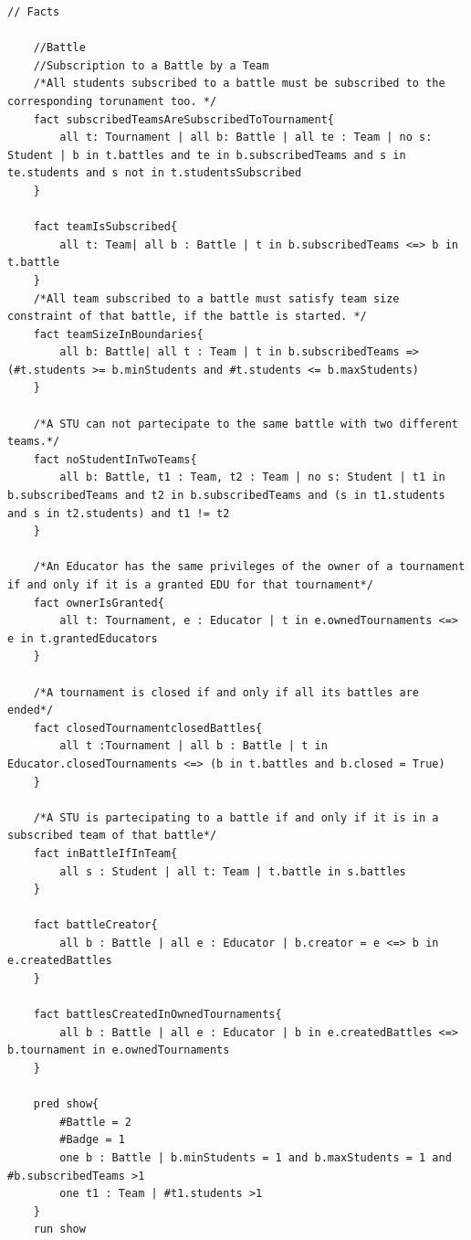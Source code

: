 \begin{lstlisting}[language=Alloy,  label={lst:alloycode}, basicstyle=\fontfamily{Roboto}\selectfont\ttfamily]
    // Facts
    
    //Battle
    //Subscription to a Battle by a Team
    /*All students subscribed to a battle must be subscribed to the corresponding torunament too. */
    fact subscribedTeamsAreSubscribedToTournament{
        all t: Tournament | all b: Battle | all te : Team | no s: Student | b in t.battles and te in b.subscribedTeams and s in te.students and s not in t.studentsSubscribed
    }
    
    fact teamIsSubscribed{
        all t: Team| all b : Battle | t in b.subscribedTeams <=> b in t.battle
    }
    /*All team subscribed to a battle must satisfy team size constraint of that battle, if the battle is started. */
    fact teamSizeInBoundaries{
        all b: Battle| all t : Team | t in b.subscribedTeams => (#t.students >= b.minStudents and #t.students <= b.maxStudents)
    }    
    
    /*A STU can not partecipate to the same battle with two different teams.*/
    fact noStudentInTwoTeams{
        all b: Battle, t1 : Team, t2 : Team | no s: Student | t1 in b.subscribedTeams and t2 in b.subscribedTeams and (s in t1.students and s in t2.students) and t1 != t2
    }
        
    /*An Educator has the same privileges of the owner of a tournament if and only if it is a granted EDU for that tournament*/
    fact ownerIsGranted{
        all t: Tournament, e : Educator | t in e.ownedTournaments <=> e in t.grantedEducators
    }
    
    /*A tournament is closed if and only if all its battles are ended*/
    fact closedTournamentclosedBattles{
        all t :Tournament | all b : Battle | t in Educator.closedTournaments <=> (b in t.battles and b.closed = True)
    }
    
    /*A STU is partecipating to a battle if and only if it is in a subscribed team of that battle*/
    fact inBattleIfInTeam{
        all s : Student | all t: Team | t.battle in s.battles
    }
    
    fact battleCreator{
        all b : Battle | all e : Educator | b.creator = e <=> b in e.createdBattles
    }
    
    fact battlesCreatedInOwnedTournaments{
        all b : Battle | all e : Educator | b in e.createdBattles <=> b.tournament in e.ownedTournaments 
    }
    
    pred show{
        #Battle = 2
        #Badge = 1
        one b : Battle | b.minStudents = 1 and b.maxStudents = 1 and #b.subscribedTeams >1
        one t1 : Team | #t1.students >1
    }
    run show
    
\end{lstlisting}
